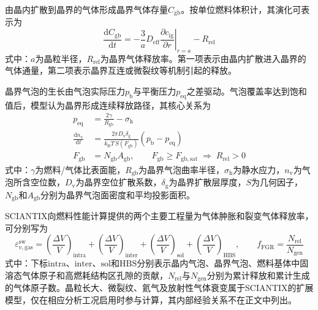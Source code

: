 由晶内扩散到晶界的气体形成晶界气体存量$C_{\mathrm{gb}}$。按单位燃料体积计，其演化可表示为
\begin{equation}
	\frac{\mathrm{d}C_{\mathrm{gb}}}{\mathrm{d}t}
	=
	-\frac{3}{a}
	D_{\mathrm{eff}}
	\left.
	\frac{\partial c_{\mathrm{ig}}}{\partial r}
	\right|_{r=a}
	-R_{\mathrm{rel}}
	\label{eq:sciantix_intergranular_balance}
\end{equation}
式中：$a$为晶粒半径，$R_{\mathrm{rel}}$为晶界气体释放率。第一项表示由晶内扩散进入晶界的气体通量，第二项表示晶界互连或微裂纹等机制引起的释放。

晶界气泡的生长由气泡实际压力$p_{\mathrm{b}}$与平衡压力$p_{\mathrm{eq}}$之差驱动。气泡覆盖率达到饱和值后，模型认为晶界形成连续释放路径，其核心关系为
\begin{equation}
	\begin{aligned}
		p_{\mathrm{eq}}
		&=\frac{2\gamma}{R_{\mathrm{gb}}}-\sigma_{\mathrm{h}}\\
		\frac{\mathrm{d}n_{\mathrm{v}}}{\mathrm{d}t}
		&=\frac{2\pi D_{\mathrm{v}}\delta_{\mathrm{g}}}
		{k_{\mathrm{B}}T\,S(F_{\mathrm{gb}})}
		\left(p_{\mathrm{b}}-p_{\mathrm{eq}}\right)\\
		F_{\mathrm{gb}}
		&=N_{\mathrm{gb}}A_{\mathrm{gb}},
		\qquad
		F_{\mathrm{gb}}\geq F_{\mathrm{gb,sat}}
		\;\Longrightarrow\;
		R_{\mathrm{rel}}>0
	\end{aligned}
	\label{eq:sciantix_bubble_growth_interconnection}
\end{equation}
式中：$\gamma$为燃料/气体比表面能，$R_{\mathrm{gb}}$为晶界气泡曲率半径，$\sigma_{\mathrm{h}}$为静水应力，$n_{\mathrm{v}}$为气泡所含空位数，$D_{\mathrm{v}}$为晶界空位扩散系数，$\delta_{\mathrm{g}}$为晶界扩散层厚度，$S$为几何因子，$N_{\mathrm{gb}}$和$A_{\mathrm{gb}}$分别为晶界气泡面密度和平均投影面积。

SCIANTIX向燃料性能计算提供的两个主要工程量为气体肿胀和裂变气体释放率，可分别写为
\begin{equation}
	\varepsilon_{v,\mathrm{gas}}^{\mathrm{sw}}
	=
	\left(\frac{\Delta V}{V}\right)_{\mathrm{intra}}
	+
	\left(\frac{\Delta V}{V}\right)_{\mathrm{inter}}
	+
	\left(\frac{\Delta V}{V}\right)_{\mathrm{sol}}
	+
	\left(\frac{\Delta V}{V}\right)_{\mathrm{HBS}},
	\qquad
	f_{\mathrm{FGR}}
	=
	\frac{N_{\mathrm{rel}}}{N_{\mathrm{gen}}}
	\label{eq:sciantix_engineering_outputs}
\end{equation}
式中：下标$\mathrm{intra}$、$\mathrm{inter}$、$\mathrm{sol}$和$\mathrm{HBS}$分别表示晶内气泡、晶界气泡、燃料基体中固溶态气体原子和高燃耗结构区孔隙的贡献，$N_{\mathrm{rel}}$与$N_{\mathrm{gen}}$分别为累计释放和累计生成的气体原子数。晶粒长大、微裂纹、氦气及放射性气体衰变属于SCIANTIX的扩展模型，仅在相应分析工况启用时参与计算，其内部经验关系不在正文中列出\cite{baraniAnalysisTransientFission2017,pastoreModellingTransientFission2014}。

